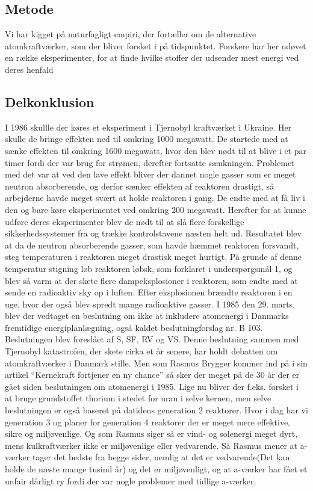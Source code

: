 \documentclass{article}
\begin{document}
\subsection{Metode}

Vi har kigget på naturfagligt empiri, der fortæller om de alternative atomkraftværker, som der bliver forsket i på tidspunktet. Forskere har her udøvet en række eksperimenter, for at finde hvilke stoffer der udsender mest energi ved deres henfald

\subsection{Delkonklusion}

I 1986 skullle der køres et eksperiment i Tjernobyl kraftværket i Ukraine. Her skulle de bringe effekten ned til omkring 1000 megawatt. De startede med at sænke effekten til omkring 1600 megawatt, hvor den blev nødt til at blive i et par timer fordi der var brug for strømen, derefter fortsatte sænkningen. Problemet med det var at ved den lave effekt bliver der dannet nogle gasser som er meget neutron absorberende, og derfor sænker effekten af reaktoren drastigt, så arbejderne havde meget svært at holde reaktoren i gang. De endte med at få liv i den og bare køre eksperimentet ved omkring 200 megawatt. Herefter for at kunne udføre deres eksperimenter blev de nødt til at slå flere forskellige sikkerhedssystemer fra og trække kontrolstavene næsten helt ud. Resultatet blev at da de neutron absorberende gasser, som havde hæmmet reaktoren forsvandt, steg temperaturen i reaktoren meget drastisk meget hurtigt. På grunde af denne temperatur stigning løb reaktoren løbsk, som forklaret i underspørgsmål 1, og blev så varm at der skete flere dampeksplosioner i reaktoren, som endte med at sende en radioaktiv sky op i luften. Efter eksplosionen brændte reaktoren i en uge, hvor der også blev spredt mange radioaktive gasser.
I 1985 den 29. marts, blev der vedtaget en beslutning om ikke at inkludere atomenergi i Danmarks fremtidige energiplanlægning, også kaldet beslutningforslag nr. B 103. Beslutningen blev foreslået af S, SF, RV og VS. Denne beslutning sammen med Tjernobyl katastrofen, der skete cirka et år senere, har holdt debatten om atomkraftværker i Danmark stille.
Men som Rasmus Brygger kommer ind på i sin artikel “Kernekraft fortjener en ny chance” så sker der meget på de 30 år der er gået siden beslutningen om atomenergi i 1985. Lige nu bliver der f.eks. forsket i at bruge grundstoffet thorium i stedet for uran i selve kernen, men selve beslutningen er også baseret på datidens generation 2 reaktorer. Hvor i dag har vi generation 3 og planer for generation 4 reaktorer der er meget mere effektive, sikre og miljøvenlige. Og som Rasmus siger så er vind- og solenergi meget dyrt, mens kulkraftværker ikke er miljøvenlige eller vedvarende. Så Rasmus mener at a-værker tager det bedste fra begge sider, nemlig at det er vedvarende(Det kan holde de næste mange tusind år) og det er miljøvenligt, og at a-værker har fået et unfair dårligt ry fordi der var nogle problemer med tidlige a-værker.
\end{document}
